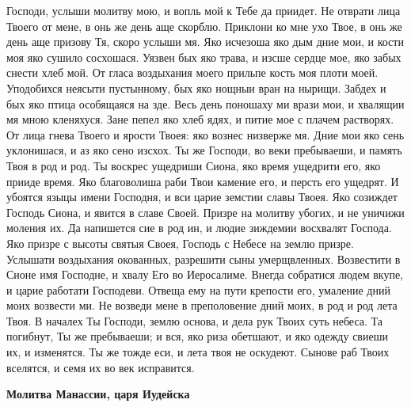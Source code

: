 Господи, услыши молитву мою, и вопль мой к Тебе да приидет. Не отврати лица Твоего от мене, в онь же день аще скорблю. Приклони ко мне ухо Твое, в онь же день аще призову Тя, скоро услыши мя. Яко исчезоша яко дым дние мои, и кости моя яко сушило сосхошася. Уязвен бых яко трава, и изсше сердце мое, яко забых снести хлеб мой. От гласа воздыхания моего прильпе кость моя плоти моей. Уподобихся неясыти пустынному, бых яко нощныи вран на нырищи. Забдех и бых яко птица особящаяся на зде. Весь день поношаху ми врази мои, и хвалящии мя мною кленяхуся. Зане пепел яко хлеб ядях, и питие мое с плачем растворях. От лица гнева Твоего и ярости Твоея: яко вознес низверже мя. Дние мои яко сень уклонишася, и аз яко сено изсхох. Ты же Господи, во веки пребываеши, и память Твоя в род и род. Ты воскрес ущедриши Сиона, яко время ущедрити его, яко прииде время. Яко благоволиша раби Твои камение его, и персть его ущедрят. И убоятся языцы имени Господня, и вси царие земстии славы Твоея. Яко созиждет Господь Сиона, и явится в славе Своей. Призре на молитву убогих, и не уничижи моления их. Да напишется сие в род ин, и людие зиждемии восхвалят Господа. Яко призре с высоты святыя Своея, Господь с Небесе на землю призре. Услышати воздыхания окованных, разрешити сыны умерщвленных. Возвестити в Сионе имя Господне, и хвалу Его во Иеросалиме. Внегда собратися людем вкупе, и царие работати Господеви. Отвеща ему на пути крепости его, умаление дний моих возвести ми. Не возведи мене в преполовение дний моих, в род и род лета Твоя. В началех Ты Господи, землю основа, и дела рук Твоих суть небеса. Та погибнут, Ты же пребываеши; и вся, яко риза обетшают, и яко одежду свиеши их, и изменятся. Ты же тожде еси, и лета твоя не оскудеют. Сынове раб Твоих вселятся, и семя их во век исправится.





\bfseries Молитва Манассии, царя Иудейска\normalfont{}



